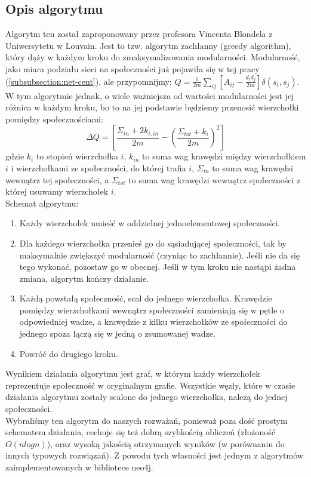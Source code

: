 \documentclass{article}
\begin{document}
\subsection{Opis algorytmu}
Algorytm ten został zaproponowany przez profesora Vincenta Blondela z Uniwersytetu w Louvain. Jest to tzw. algorytm zachłanny (greedy algorithm), który dąży w każdym kroku do zmaksymalizowania modularności. Modularność, jako miara podziału sieci na społeczności już pojawiła się w tej pracy (\ref{subsubsection:net-cent}), ale przypomnijmy: $Q= \frac{1}{2m} \sum\limits_{ij} [A_{ij} - \frac{d_i d_j}{2m}]\delta(s_i,s_j)$. W tym algorytmie jednak, o wiele ważniejsza od wartości modularności jest jej różnica w każdym kroku, bo to na jej podstawie będziemy przenosić wierzchołki pomiędzy społecznościami:  $$\Delta Q = [\frac{\Sigma_{in} +2k_{i,in}}{2m} - (\frac{\Sigma_{tot} + k_i}{2m})^2]$$ gdzie $k_i$ to stopień wierzchołka $i$, $k_{in}$ to suma wag krawędzi między wierzchołkiem $i$ i wierzchołkami ze społeczności, do której trafia $i$, $\Sigma_{in}$ to suma wag krawędzi wewnątrz tej społeczności, a $\Sigma_{tot}$ to suma wag krawędzi wewnątrz społeczności z której usuwamy wierzchołek $i$. \\
Schemat algorytmu:
\begin{enumerate}
\item Każdy wierzchołek umieść w oddzielnej jednoelementowej społeczności.
\item Dla każdego wierzchołka przenieś go do sąsiadującej społeczności, tak by maksymalnie zwiększyć modularność (czyniąc to zachłannie). Jeśli nie da się tego wykonać, pozostaw go w obecnej. Jeśli w tym kroku nie nastąpi żadna zmiana, algorytm kończy działanie.
\item Każdą powstałą społeczność, scal do jednego wierzchołka. Krawędzie pomiędzy wierzchołkami wewnątrz społeczności zamieniają się w pętle o odpowiedniej wadze, a krawędzie z kilku wierzchołków ze społeczności do jednego spoza łączą się w jedną o zsumowanej wadze.
\item Powróć do drugiego kroku.
\end{enumerate}
Wynikiem działania algorytmu jest  graf, w którym każdy wierzchołek reprezentuje społeczność w oryginalnym grafie. Wszystkie węzły, które w czasie działania algorytmu zostały scalone do jednego wierzchołka, należą do jednej społeczności. \\ 
Wybraliśmy ten algorytm do naszych rozważań, ponieważ poza dość prostym schematem działania, cechuje się też dobrą szybkością obliczeń (złożoność $O(nlogn)$), oraz wysoką jakością otrzymanych wyników (w porównaniu do innych typowych rozwiązań). Z powodu tych własności jest jednym z algorytmów zaimplementowanych w bibliotece neo4j.
\end{document}
